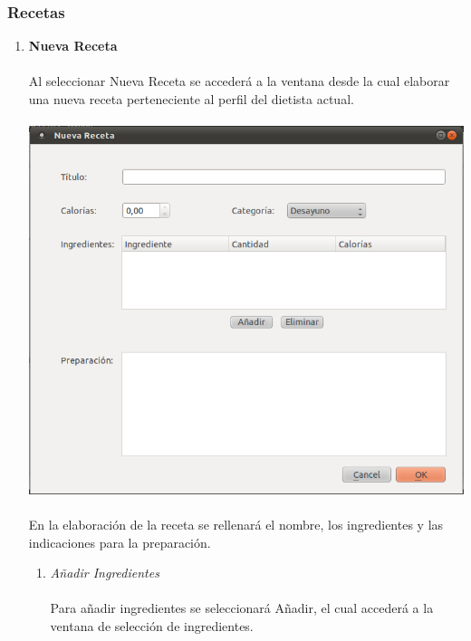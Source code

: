 \documentclass[12pt, spanish]{article}
\begin{document}
\subsubsection{Recetas}
\begin{enumerate}
\item \textbf{Nueva Receta}\\\\
Al seleccionar Nueva Receta se accederá a la ventana desde la cual elaborar una nueva receta perteneciente al perfil del dietista actual.\\\\
\includegraphics[scale=0.5]{Image/receta-nueva.png}\\\\
En la elaboración de la receta se rellenará el nombre, los ingredientes y las indicaciones para la preparación. 
\begin{enumerate}
\item \textit{Añadir Ingredientes}\\\\
Para añadir ingredientes se seleccionará Añadir, el cual accederá a la ventana de selección de ingredientes.\\\\

\end{enumerate}
\end{enumerate}
\end{document}
